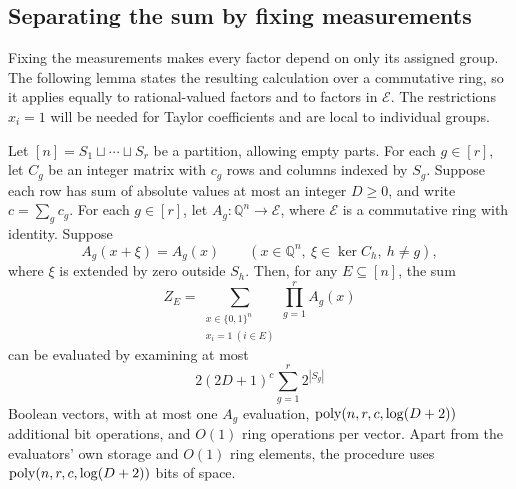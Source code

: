\subsection{Separating the sum by fixing measurements}
\label{subsec:measurement-factorization}
Fixing the measurements makes every factor depend on only its assigned
group. The following lemma states the resulting calculation over a
commutative ring, so it applies equally to rational-valued factors and
to factors in $\mathcal E$. The restrictions $x_i=1$ will be needed
for Taylor coefficients and are local to individual groups.

\begin{lemma}\label{lem:measurement-separation}
Let $[n]=S_1\sqcup\cdots\sqcup S_r$ be a partition, allowing empty parts.
For each $g\in[r]$, let $C_g$ be an integer matrix with $c_g$ rows
and columns indexed by $S_g$. Suppose each row has sum of absolute
values at most an integer $D\ge0$, and write $c=\sum_g c_g$.
For each $g\in[r]$, let $A_g:\mathbb Q^n\to\mathcal E$, where
$\mathcal E$ is a commutative ring with identity. Suppose
\[
 A_g(x+\xi)=A_g(x)
 \qquad
 (x\in\mathbb Q^n,\ \xi\in\ker C_h,\ h\ne g),
\]
where $\xi$ is extended by zero outside $S_h$.
Then, for any $E\subseteq[n]$, the sum
\[
 Z_E=\sum_{\substack{x\in\{0,1\}^n\\x_i=1\ (i\in E)}}
           \prod_{g=1}^r A_g(x)
\]
can be evaluated by examining at most
\[
 2(2D+1)^c\sum_{g=1}^r2^{|S_g|}
\]
Boolean vectors, with at most one $A_g$ evaluation,
$\operatorname{poly}(n,r,c,\log(D+2))$ additional bit operations, and $O(1)$ ring
operations per vector. Apart from the evaluators' own storage and
$O(1)$ ring elements, the procedure uses $\operatorname{poly}(n,r,c,\log(D+2))$
bits of space.
\end{lemma}
